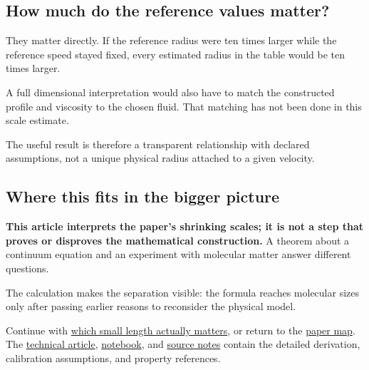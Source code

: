 \documentclass[
  english,
  11pt,
]{article}
\begin{document}
\subsection{How much do the reference values
matter?}\label{how-much-do-the-reference-values-matter}

They matter directly. If the reference radius were ten times larger
while the reference speed stayed fixed, every estimated radius in the
table would be ten times larger.

A full dimensional interpretation would also have to match the
constructed profile and viscosity to the chosen fluid. That matching has
not been done in this scale estimate.

The useful result is therefore a transparent relationship with declared
assumptions, not a unique physical radius attached to a given velocity.

\subsection{Where this fits in the bigger
picture}\label{where-this-fits-in-the-bigger-picture}

\textbf{This article interprets the paper's shrinking scales; it is not
a step that proves or disproves the mathematical construction.} A
theorem about a continuum equation and an experiment with molecular
matter answer different questions.

The calculation makes the separation visible: the formula reaches
molecular sizes only after passing earlier reasons to reconsider the
physical model.

Continue with \href{../d9_regime_map/article.html}{which small length
actually matters}, or return to the
\href{../paper-map/article.html}{paper map}. The
\href{technical-article.html}{technical article},
\href{../../code/d1_core_size/study.ipynb}{notebook}, and
\href{source-notes.md}{source notes} contain the detailed derivation,
calibration assumptions, and property references.
\end{document}
